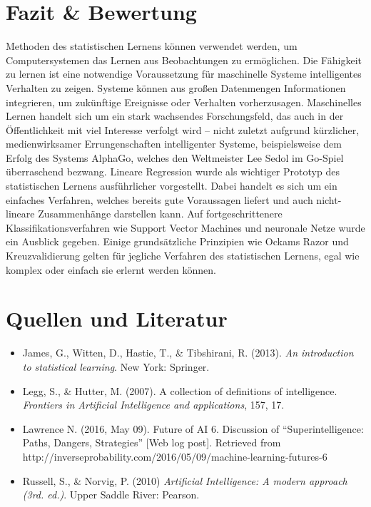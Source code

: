 \section{Fazit \& Bewertung}

Methoden des statistischen Lernens können verwendet werden, um Computersystemen das
Lernen aus Beobachtungen zu ermöglichen. Die Fähigkeit zu lernen ist eine notwendige
Voraussetzung für maschinelle Systeme intelligentes Verhalten zu zeigen. Systeme
können aus großen Datenmengen Informationen integrieren, um zukünftige Ereignisse
oder Verhalten vorherzusagen. Maschinelles Lernen handelt sich um ein stark
wachsendes Forschungsfeld, das auch in der Öffentlichkeit mit viel Interesse verfolgt
wird -- nicht zuletzt aufgrund kürzlicher, medienwirksamer Errungenschaften
intelligenter Systeme, beispielsweise dem Erfolg des Systems AlphaGo, welches den
Weltmeister Lee Sedol im Go-Spiel überraschend bezwang. Lineare Regression wurde als
wichtiger Prototyp des statistischen Lernens ausführlicher vorgestellt. Dabei handelt
es sich um ein einfaches Verfahren, welches bereits gute Voraussagen liefert und auch
nicht-lineare Zusammenhänge darstellen kann. Auf fortgeschrittenere
Klassifikationsverfahren wie Support Vector Machines und neuronale Netze wurde ein
Ausblick gegeben. Einige grundsätzliche Prinzipien wie Ockams Razor und
Kreuzvalidierung gelten für jegliche Verfahren des statistischen Lernens, egal wie
komplex oder einfach sie erlernt werden können.

\section{Quellen und Literatur}
\begin{itemize}
\item James, G., Witten, D., Hastie, T., \& Tibshirani, R. (2013). \emph{An introduction to
statistical learning}. New York: Springer.

\item Legg, S., \& Hutter, M. (2007). A collection of definitions of intelligence. \emph{Frontiers
in Artificial Intelligence and applications}, 157, 17.

\item Lawrence N. (2016, May 09). Future of AI 6. Discussion of ``Superintelligence: Paths,
Dangers, Strategies'' [Web log post]. Retrieved from \newline
http://inverseprobability.com/2016/05/09/machine-learning-futures-6

\item Russell, S., \& Norvig, P. (2010) \emph{Artificial Intelligence: A modern approach
  (3rd. ed.)}. Upper Saddle River: Pearson.
\end{itemize}
